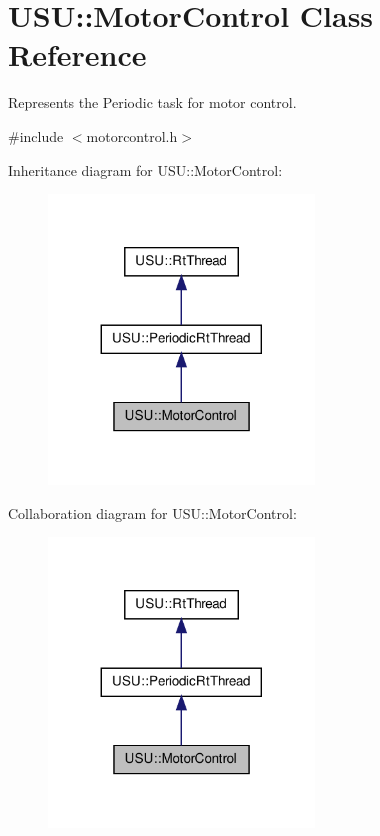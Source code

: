 \hypertarget{class_u_s_u_1_1_motor_control}{\section{\-U\-S\-U\-:\-:\-Motor\-Control \-Class \-Reference}
\label{class_u_s_u_1_1_motor_control}
}


\-Represents the \-Periodic task for motor control.  




{\ttfamily \#include $<$motorcontrol.\-h$>$}



\-Inheritance diagram for \-U\-S\-U\-:\-:\-Motor\-Control\-:
\nopagebreak
\begin{figure}[H]
\begin{center}
\leavevmode
\includegraphics[width=200pt]{class_u_s_u_1_1_motor_control__inherit__graph}
\end{center}
\end{figure}


\-Collaboration diagram for \-U\-S\-U\-:\-:\-Motor\-Control\-:
\nopagebreak
\begin{figure}[H]
\begin{center}
\leavevmode
\includegraphics[width=200pt]{class_u_s_u_1_1_motor_control__coll__graph}
\end{center}
\end{figure}
